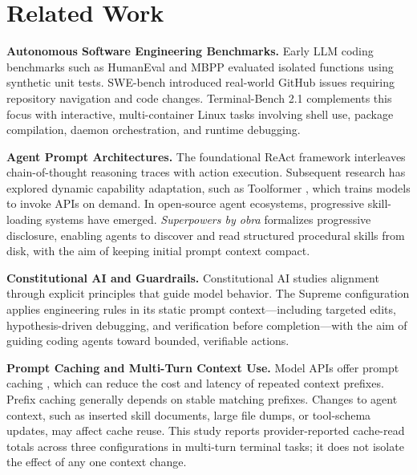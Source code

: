 \section{Related Work}
\label{sec:related_work}

\textbf{Autonomous Software Engineering Benchmarks.} 
Early LLM coding benchmarks such as HumanEval and MBPP evaluated isolated functions using synthetic unit tests. SWE-bench \cite{jimenez2024swebench} introduced real-world GitHub issues requiring repository navigation and code changes. Terminal-Bench 2.1 \cite{shaw2025terminalbench} complements this focus with interactive, multi-container Linux tasks involving shell use, package compilation, daemon orchestration, and runtime debugging.

\textbf{Agent Prompt Architectures.}
The foundational ReAct framework \cite{yao2023react} interleaves chain-of-thought reasoning traces with action execution. Subsequent research has explored dynamic capability adaptation, such as Toolformer \cite{schick2024toolformer}, which trains models to invoke APIs on demand. In open-source agent ecosystems, progressive skill-loading systems have emerged. \textit{Superpowers by obra} \cite{vincent2025superpowers} formalizes progressive disclosure, enabling agents to discover and read structured procedural skills from disk, with the aim of keeping initial prompt context compact.

\textbf{Constitutional AI and Guardrails.}
Constitutional AI \cite{bai2022constitutional} studies alignment through explicit principles that guide model behavior. The Supreme configuration applies engineering rules in its static prompt context---including targeted edits, hypothesis-driven debugging, and verification before completion---with the aim of guiding coding agents toward bounded, verifiable actions.

\textbf{Prompt Caching and Multi-Turn Context Use.}
Model APIs offer prompt caching \cite{anthropic2024promptcaching, google2026gemini36}, which can reduce the cost and latency of repeated context prefixes. Prefix caching generally depends on stable matching prefixes. Changes to agent context, such as inserted skill documents, large file dumps, or tool-schema updates, may affect cache reuse. This study reports provider-reported cache-read totals across three configurations in multi-turn terminal tasks; it does not isolate the effect of any one context change.
